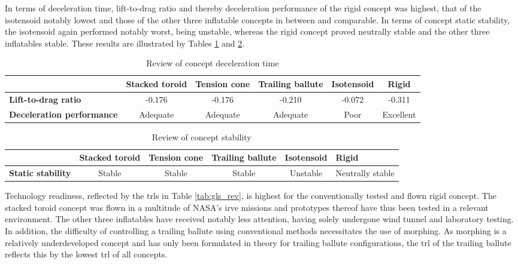 In terms of deceleration time, lift-to-drag ratio and thereby deceleration performance of the rigid concept was highest, that of the isotensoid notably lowest and those of the other three inflatable concepts in between and comparable. In terms of concept static stability, the isotensoid again performed notably worst, being unstable, whereas the rigid concept proved neutrally stable and the other three inflatables stable. These results are illustrated by Tables \ref{tab:decel} and \ref{tab:stab}.

\begin{table}
\caption{Review of concept deceleration time}
\hspace{-10mm}
\begin{tabular}{|p{2.5cm}|c|c|c|c|c|}
\hline
\textbf{}                          & \textbf{Stacked toroid} & \textbf{Tension cone} & \textbf{Trailing ballute} & \textbf{Isotensoid} & \textbf{Rigid} \\ \hline
\textbf{Lift-to-drag ratio} & \cellcolor{yellow!75} -0.176  &\cellcolor{yellow!75} -0.176   &\cellcolor{yellow!75} -0.210 & \cellcolor{red!60} -0.072 &\cellcolor{green!70} -0.311              \\ \hline
\textbf{Deceleration performance} &\cellcolor{yellow!75} Adequate &\cellcolor{yellow!75}  Adequate  &\cellcolor{yellow!75} Adequate & \cellcolor{red!60}     Poor       &\cellcolor{green!70} Excellent                 \\ \hline
\end{tabular}
\label{tab:decel}
\end{table}

\begin{table}
\caption{Review of concept stability}
\hspace{-10mm}
\begin{tabular}{|p{2.5cm}|c|c|c|c|p{2cm}|}
\hline
\textbf{}                          & \textbf{Stacked toroid} & \textbf{Tension cone} & \textbf{Trailing ballute} & \textbf{Isotensoid} & \textbf{Rigid} \\ \hline
\textbf{Static stability} &\cellcolor{green!70} Stable  &\cellcolor{green!70}  Stable   &\cellcolor{green!70} Stable & \cellcolor{red!60}   Unstable          &\cellcolor{yellow!75} Neutrally stable                 \\ \hline
\end{tabular}
\label{tab:stab}
\end{table}

Technology readiness, reflected by the \glspl{trl} in Table \ref{tab:gls_rev}, is highest for the conventionally tested and flown rigid concept. The stacked toroid concept was flown in a multitude of NASA's \gls{irve} missions and prototypes thereof have thus been tested in a relevant environment. The other three inflatables have received notably less attention, having solely undergone wind tunnel and laboratory testing. In addition, the difficulty of controlling a trailing ballute using conventional methods necessitates the use of morphing. As morphing is a relatively underdeveloped concept and has only been formulated in theory for trailing ballute configurations, the \gls{trl} of the trailing ballute reflects this by the lowest \gls{trl} of all concepts.

